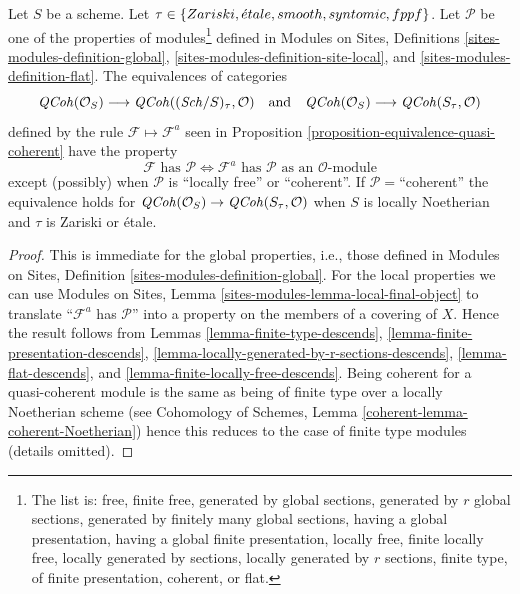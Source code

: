 \begin{lemma}
\label{lemma-equivalence-quasi-coherent-properties}
Let $S$ be a scheme.
Let $\tau \in \{Zariski, \linebreak[0] \etale, \linebreak[0]
smooth, \linebreak[0] syntomic, \linebreak[0] fppf\}$.
Let $\mathcal{P}$ be one of the properties of modules\footnote{The list is:
free, finite free, generated by global sections,
generated by $r$ global sections, generated by finitely many global sections,
having a global presentation, having a global finite presentation,
locally free, finite locally free, locally generated by sections,
locally generated by $r$ sections, finite type, of finite presentation,
coherent, or flat.} defined in
Modules on Sites, Definitions \ref{sites-modules-definition-global},
\ref{sites-modules-definition-site-local}, and
\ref{sites-modules-definition-flat}.
The equivalences of categories
$$
\mathit{QCoh}(\mathcal{O}_S)
\longrightarrow
\mathit{QCoh}((\mathit{Sch}/S)_\tau, \mathcal{O})
\quad\text{and}\quad
\mathit{QCoh}(\mathcal{O}_S)
\longrightarrow
\mathit{QCoh}(S_\tau, \mathcal{O})
$$
defined by the rule $\mathcal{F} \mapsto \mathcal{F}^a$ seen in
Proposition \ref{proposition-equivalence-quasi-coherent}
have the property
$$
\mathcal{F}\text{ has }\mathcal{P}
\Leftrightarrow
\mathcal{F}^a\text{ has }\mathcal{P}\text{ as an }\mathcal{O}\text{-module}
$$
except (possibly) when $\mathcal{P}$ is ``locally free'' or ``coherent''.
If $\mathcal{P}=$``coherent'' the equivalence
holds for $\mathit{QCoh}(\mathcal{O}_S) \to \mathit{QCoh}(S_\tau, \mathcal{O})$
when $S$ is locally Noetherian and $\tau$ is Zariski or \'etale.
\end{lemma}

\begin{proof}
This is immediate for the global properties, i.e., those defined in
Modules on Sites, Definition \ref{sites-modules-definition-global}.
For the local properties we can use
Modules on Sites, Lemma \ref{sites-modules-lemma-local-final-object}
to translate ``$\mathcal{F}^a$ has $\mathcal{P}$'' into a property
on the members of a covering of $X$. Hence the result follows from
Lemmas \ref{lemma-finite-type-descends},
\ref{lemma-finite-presentation-descends},
\ref{lemma-locally-generated-by-r-sections-descends},
\ref{lemma-flat-descends}, and
\ref{lemma-finite-locally-free-descends}.
Being coherent for a quasi-coherent module is the same as being
of finite type over a locally Noetherian scheme (see
Cohomology of Schemes, Lemma \ref{coherent-lemma-coherent-Noetherian})
hence this reduces
to the case of finite type modules (details omitted).
\end{proof}










